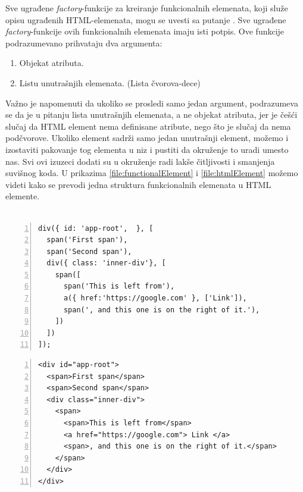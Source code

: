 \documentclass[12pt,oneside]{memoir}
\newcommand{\code}[1]{\allowbreak{\colorbox{codegray}{\texttt{\scalebox{0.9}{#1}}}}}%
\begin{document}
Sve ugrađene \emph{factory}-funkcije za kreiranje funkcionalnih elemenata, koji služe opisu ugrađenih HTML-elemenata, mogu se uvesti sa putanje \code{"pure-framework/html"}.
Sve ugrađene \emph{factory}-funkcije ovih funkcionalnih elemenata imaju isti potpis.
Ove funkcije podrazumevano prihvataju dva argumenta:
\begin{enumerate}
  \item Objekat atributa. \label{enum:attr-list}
  \item Listu unutrašnjih elemenata. (Lista čvorova-dece)
\end{enumerate}
Važno je napomenuti da ukoliko se prosledi samo jedan argument, podrazumeva se da je u pitanju lista unutrašnjih elemenata,
a ne objekat atributa, jer je češći slučaj da HTML element nema definisane atribute, nego što je slučaj da nema podčvorove.
Ukoliko element sadrži samo jedan unutrašnji element, možemo i izostaviti pakovanje tog elementa u niz i pustiti da okruženje
to uradi umesto nas.
Svi ovi izuzeci dodati su u okruženje radi lakše čitljivosti i smanjenja suvišnog koda. U prikazima \ref{file:functionalElement} i \ref{file:htmlElement}
možemo videti kako se prevodi jedna
struktura funkcionalnih elemenata u HTML elemente.
\\
\\
\noindent\begin{minipage}[b]{.46\textwidth}
\begin{lstlisting}[style=jsStyle, numbers=left, numberstyle=\tiny, caption={Funkcionalni element},label=file:functionalElement]
div({ id: 'app-root',  }, [
  span('First span'),
  span('Second span'),
  div({ class: 'inner-div'}, [
    span([
      span('This is left from'),
      a({ href:'https://google.com' }, ['Link']),
      span(', and this one is on the right of it.'),
    ])
  ])
]);
\end{lstlisting}
\end{minipage}
\hfill
\begin{minipage}[b]{.46\textwidth}
\begin{lstlisting}[style=htmlStyle, numbers=left, numberstyle=\tiny, caption={Rezultujući HTML},label=file:htmlElement]
<div id="app-root">
  <span>First span</span>
  <span>Second span</span>
  <div class="inner-div">
    <span>
      <span>This is left from</span>
      <a href="https://google.com"> Link </a>
      <span>, and this one is on the right of it.</span>
    </span>
  </div>
</div>
\end{lstlisting}
\end{minipage}
\end{document}
